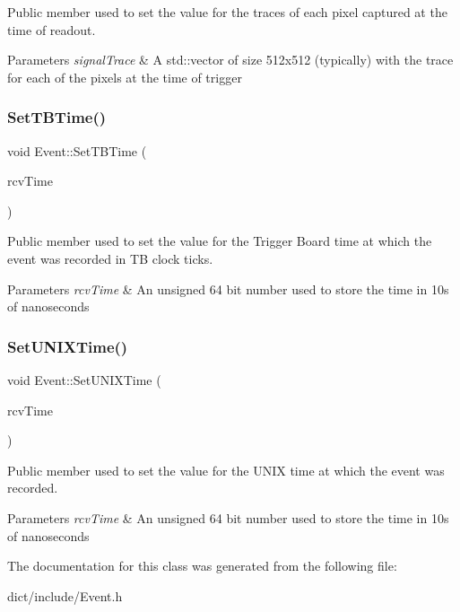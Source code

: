 Public member used to set the value for the traces of each pixel captured at the time of readout. 


\begin{DoxyParams}{Parameters}
{\em signal\+Trace} & A std\+::vector of size 512x512 (typically) with the trace for each of the pixels at the time of trigger \\
\hline
\end{DoxyParams}
\mbox{\label{classEvent_a3ac44ccc4562c58ec07b12d96709e0aa}} 
\subsubsection{\texorpdfstring{Set\+T\+B\+Time()}{SetTBTime()}}
{\footnotesize\ttfamily void Event\+::\+Set\+T\+B\+Time (\begin{DoxyParamCaption}\item[{U\+Long64\+\_\+t}]{rcv\+Time }\end{DoxyParamCaption})}



Public member used to set the value for the Trigger Board time at which the event was recorded in TB clock ticks. 


\begin{DoxyParams}{Parameters}
{\em rcv\+Time} & An unsigned 64 bit number used to store the time in 10s of nanoseconds \\
\hline
\end{DoxyParams}
\mbox{\label{classEvent_ac73a250bfe5eb42e8eb74766a42a6973}} 
\subsubsection{\texorpdfstring{Set\+U\+N\+I\+X\+Time()}{SetUNIXTime()}}
{\footnotesize\ttfamily void Event\+::\+Set\+U\+N\+I\+X\+Time (\begin{DoxyParamCaption}\item[{U\+Long64\+\_\+t}]{rcv\+Time }\end{DoxyParamCaption})}



Public member used to set the value for the U\+N\+IX time at which the event was recorded. 


\begin{DoxyParams}{Parameters}
{\em rcv\+Time} & An unsigned 64 bit number used to store the time in 10s of nanoseconds \\
\hline
\end{DoxyParams}


The documentation for this class was generated from the following file\+:\begin{DoxyCompactItemize}
\item 
dict/include/Event.\+h\end{DoxyCompactItemize}
